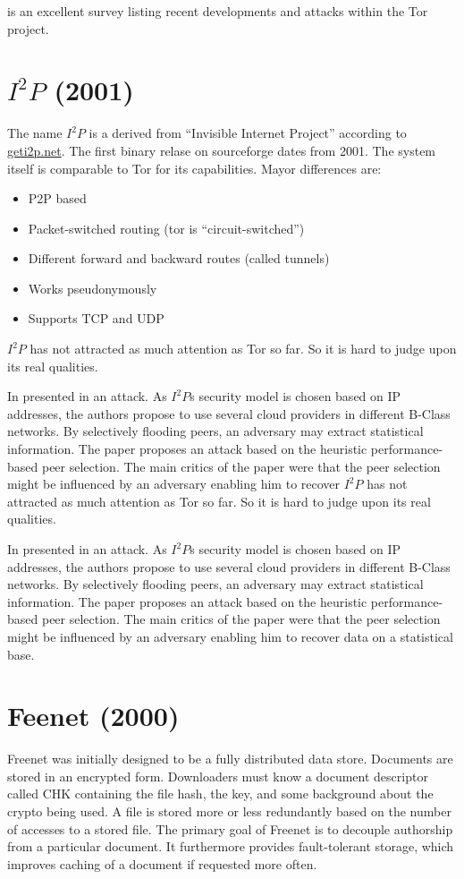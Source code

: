 \cite{saleh2018shedding} is an excellent survey listing recent developments and attacks within the Tor project.

\section{\texorpdfstring{$I^2P$}{I2P} (2001)}
The name $I^2P$ is a derived from  ``Invisible Internet Project'' according to \href{https://geti2p.net/}{geti2p.net}. The first binary relase on sourceforge dates from 2001. The system itself is comparable to Tor for its capabilities. Mayor differences are:
\begin{itemize}
	\item P2P based
	\item Packet-switched routing (tor is ``circuit-switched'')
	\item Different forward and backward routes (called tunnels)
	\item Works pseudonymously
	\item Supports TCP and UDP
\end{itemize}

$I^2P$ has not attracted as much attention as Tor so far. So it is hard to judge upon its real qualities.

In \citeyear{pets2011-i2p} \citeauthor{pets2011-i2p} presented in \cite{pets2011-i2p} an attack. As $I^2P$s security model is chosen based on IP addresses, the authors propose to use several cloud providers in different B-Class networks. By selectively flooding peers, an adversary may extract statistical information. The paper proposes an attack based on the heuristic performance-based peer selection. The main critics of the paper were that the peer selection might be influenced by an adversary enabling him to recover $I^2P$ has not attracted as much attention as Tor so far. So it is hard to judge upon its real qualities.

In \citeyear{pets2011-i2p} \citeauthor{pets2011-i2p} presented in \cite{pets2011-i2p} an attack. As $I^2P$s security model is chosen based on IP addresses, the authors propose to use several cloud providers in different B-Class networks. By selectively flooding peers, an adversary may extract statistical information. The paper proposes an attack based on the heuristic performance-based peer selection. The main critics of the paper were that the peer selection might be influenced by an adversary enabling him to recover data on a statistical base.
\section{Feenet (2000)}
Freenet was initially designed to be a fully distributed data store\cite{freenet}. Documents are stored in an encrypted form. Downloaders must know a document descriptor called CHK containing the file hash, the key, and some background about the crypto being used. A file is stored more or less redundantly based on the number of accesses to a stored file. The primary goal of Freenet is to decouple authorship from a particular document. It furthermore provides fault-tolerant storage, which improves caching of a document if requested more often.

